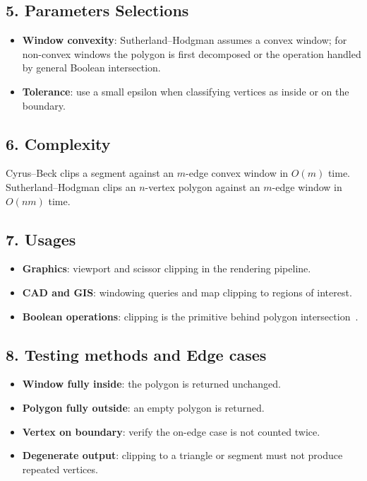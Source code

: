 \subsection{5. Parameters Selections}
\begin{itemize}
    \item \textbf{Window convexity}: Sutherland--Hodgman assumes a convex window; for non-convex windows the polygon is first decomposed or the operation handled by general Boolean intersection.
    \item \textbf{Tolerance}: use a small epsilon when classifying vertices as inside or on the boundary.
\end{itemize}

\subsection{6. Complexity}
Cyrus--Beck clips a segment against an $m$-edge convex window in $O(m)$ time. Sutherland--Hodgman clips an $n$-vertex polygon against an $m$-edge window in $O(nm)$ time.

\subsection{7. Usages}
\begin{itemize}
    \item \textbf{Graphics}: viewport and scissor clipping in the rendering pipeline.
    \item \textbf{CAD and GIS}: windowing queries and map clipping to regions of interest.
    \item \textbf{Boolean operations}: clipping is the primitive behind polygon intersection~\cite{vatti1992}.
\end{itemize}

\subsection{8. Testing methods and Edge cases}
\begin{itemize}
    \item \textbf{Window fully inside}: the polygon is returned unchanged.
    \item \textbf{Polygon fully outside}: an empty polygon is returned.
    \item \textbf{Vertex on boundary}: verify the on-edge case is not counted twice.
    \item \textbf{Degenerate output}: clipping to a triangle or segment must not produce repeated vertices.
\end{itemize}

